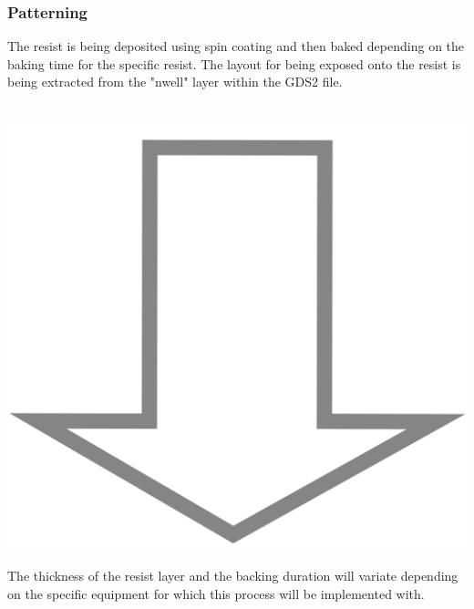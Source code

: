 \subsubsection{Patterning}
The resist is being deposited using spin coating and then baked depending on the baking time for the specific resist.
The layout for being exposed onto the resist is being extracted from the "nwell" layer within the GDS2 file.
\begin{center}
	\begin{tikzpicture}[node distance = 3cm, auto, thick,scale=0.2, every node/.style={transform shape}]
		
	\end{tikzpicture}
	\begin{tikzpicture}[node distance = 3cm, auto, thick,scale=0.2, every node/.style={transform shape}]
		
	\end{tikzpicture} \\
	\includegraphics[scale=0.01]{down_arrow.png} \\
	\begin{tikzpicture}[node distance = 3cm, auto, thick,scale=0.2, every node/.style={transform shape}]
		
	\end{tikzpicture}
	\begin{tikzpicture}[node distance = 3cm, auto, thick,scale=0.2, every node/.style={transform shape}]
		
	\end{tikzpicture}
\end{center}
The thickness of the resist layer and the backing duration will variate depending on the specific equipment for which this process will be implemented with.

